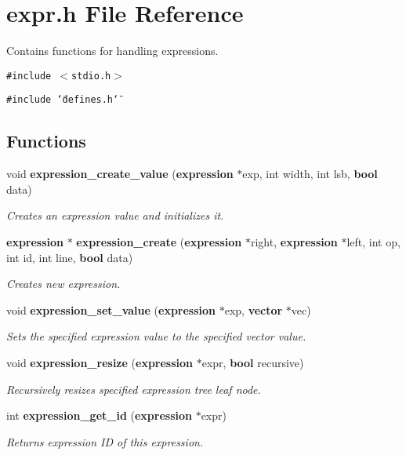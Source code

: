 \section{expr.h File Reference}
\label{expr_8h}
Contains functions for handling expressions.  


{\tt \#include $<$stdio.h$>$}\par
{\tt \#include \char`\"{}defines.h\char`\"{}}\par
\subsection*{Functions}
\begin{CompactItemize}
\item 
void {\bf expression\_\-create\_\-value} ({\bf expression} $\ast$exp, int width, int lsb, {\bf bool} data)
\begin{CompactList}\small\item\em Creates an expression value and initializes it. \item\end{CompactList}\item 
{\bf expression} $\ast$ {\bf expression\_\-create} ({\bf expression} $\ast$right, {\bf expression} $\ast$left, int op, int id, int line, {\bf bool} data)
\begin{CompactList}\small\item\em Creates new expression. \item\end{CompactList}\item 
void {\bf expression\_\-set\_\-value} ({\bf expression} $\ast$exp, {\bf vector} $\ast$vec)
\begin{CompactList}\small\item\em Sets the specified expression value to the specified vector value. \item\end{CompactList}\item 
void {\bf expression\_\-resize} ({\bf expression} $\ast$expr, {\bf bool} recursive)
\begin{CompactList}\small\item\em Recursively resizes specified expression tree leaf node. \item\end{CompactList}\item 
int {\bf expression\_\-get\_\-id} ({\bf expression} $\ast$expr)
\begin{CompactList}\small\item\em Returns expression ID of this expression. \item\end{CompactList}\item 

\end{CompactItemize}
